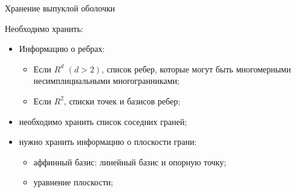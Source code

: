 \documentclass[]{beamer} %
\begin{document}
\begin{frame}{Хранение выпуклой оболочки}

    Необходимо хранить:
    \begin{itemize}
        \item Информацию о ребрах:
        \begin{itemize}
            \item Если $R^d$ $(d>2)$, список ребер, которые могут быть многомерными несимплициальными многогранниками;
            \item Если $R^2$, списки точек и базисов ребер;
        \end{itemize}
        \item необходимо хранить список соседних граней;
        \item нужно хранить информацию о плоскости грани:
        \begin{itemize}
            \item аффинный базис: линейный базис и опорную точку;
            \item уравнение плоскости;
        \end{itemize}
    \end{itemize}





\end{frame}
\end{document}
